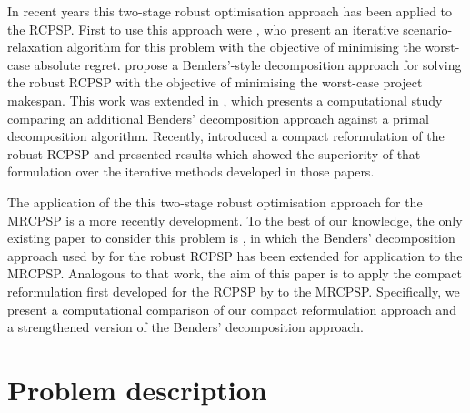 \documentclass[a4paper,abstracton]{scrartcl}
\begin{document}
In recent years this two-stage robust optimisation approach has been applied to the RCPSP. First to use this approach were \cite{artigues2013robust}, who present an iterative scenario-relaxation algorithm for this problem with the objective of minimising the worst-case absolute regret. \cite{bruni2017adjustable} propose a Benders'-style decomposition approach for solving the robust RCPSP with the objective of minimising the worst-case project makespan. This work was extended in \cite{bruni2018computational}, which presents a computational study comparing an additional Benders' decomposition approach against a primal decomposition algorithm. Recently, \cite{bold2021compact} introduced a compact reformulation of the robust RCPSP and presented results which showed the superiority of that formulation over the iterative methods developed in those papers. 

The application of the this two-stage robust optimisation approach for the MRCPSP is a more recently development. To the best of our knowledge, the only existing paper to consider this problem is \cite{balouka2021robust}, in which the Benders' decomposition approach used by \cite{bruni2017adjustable} for the robust RCPSP has been extended for application to the MRCPSP. Analogous to that work, the aim of this paper is to apply the compact reformulation first developed for the RCPSP by \cite{bold2021compact} to the MRCPSP. Specifically, we present a computational comparison of our compact reformulation approach and a strengthened version of the Benders' decomposition approach.

\section{Problem description}
\end{document}
